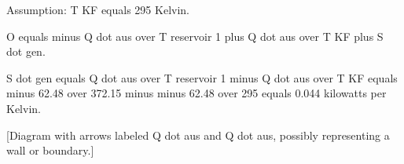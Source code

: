 Assumption: T KF equals 295 Kelvin.

O equals minus Q dot aus over T reservoir 1 plus Q dot aus over T KF plus S dot gen.

S dot gen equals Q dot aus over T reservoir 1 minus Q dot aus over T KF equals minus 62.48 over 372.15 minus minus 62.48 over 295 equals 0.044 kilowatts per Kelvin.

[Diagram with arrows labeled Q dot aus and Q dot aus, possibly representing a wall or boundary.]